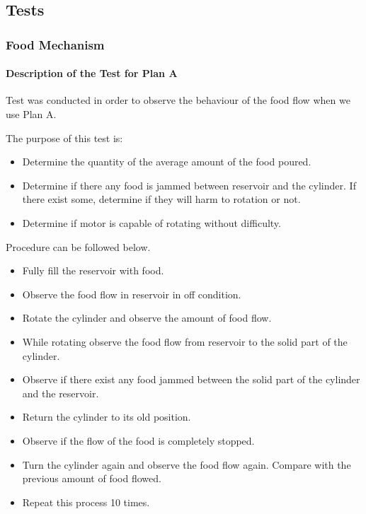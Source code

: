 \subsection{Tests}

\subsubsection{Food Mechanism}
\paragraph{Description of the Test for Plan A}
Test was conducted in order to observe the behaviour of the food flow when we use Plan A.

The purpose of this test is:
\begin{itemize}
    \item Determine the quantity of the average amount of the food poured. 
    \item Determine if there any food is jammed between reservoir and the cylinder. If there exist some, determine if they will harm to rotation or not.
    \item Determine if motor is capable of rotating without difficulty.
\end{itemize}

Procedure can be followed below.
\begin{itemize}
    \item Fully fill the reservoir with food.
    \item Observe the food flow in reservoir in off condition.
    \item Rotate the cylinder and observe the amount of food flow.
    \item While rotating observe the food flow from reservoir to the solid part of the cylinder.
    \item Observe if there exist any food jammed between the solid part of the cylinder and the reservoir. 
    \item Return the cylinder to its old position.
    \item Observe if the flow of the food is completely stopped. 
    \item Turn the cylinder again and observe the food flow again. Compare with the previous amount of food flowed.
    \item Repeat this process 10 times. 
\end{itemize}


